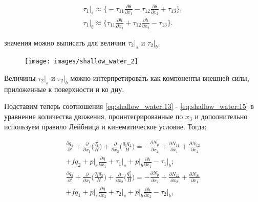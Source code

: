 \documentclass[14pt]{extreport}
\begin{document}
\begin{equation}\label{eq:shallow_water:16}
\begin{aligned}
 \tau_1\bigg|_s \approx \bigg\{ -\tau_{11}\frac{\partial \theta}{\partial x_1} -\tau_{12}\frac{\partial \theta}{\partial x_2} +\tau_{13}\bigg\}, \\
\tau_1\bigg|_b \approx \bigg\{ \tau_{11}\frac{\partial h}{\partial x_1} +\tau_{12}\frac{\partial h}{\partial x_2} -\tau_{13}\bigg\}.
\end{aligned}
\end{equation}

 значения можно выписать для величин $\tau_2|_s$ и $\tau_2|_b$.

\begin{figure}[H]
\centerline{
\texttt{[image: images/shallow\_water\_2]}}
\caption{}
\label{img:shallow_water:2}
\end{figure}


Величины $\tau_2|_s$ и $\tau_2|_b$ можно интерпретировать как компоненты внешней силы, приложенные к поверхности и ко дну.

Подставим теперь соотношения \ref{eq:shallow_water:13} - \ref{eq:shallow_water:15} в уравнение количества движения, проинтегрированные по $x_3$ и дополнительно используем правило Лейбница и кинематическое условие. Тогда:

\begin{equation}\label{eq:shallow_water:17}
\begin{aligned}
\frac{\partial q_1}{\partial t} + \frac{\partial}{\partial x_1} \bigg(\frac{q_1^2}{H}\bigg)+\frac{\partial }{\partial x_2}\bigg(\frac{q_1 q_2}{H}\bigg) = -\frac{\partial N_p}{\partial x_2} + \frac{\partial N_{11}}{\partial x_1} + \frac{\partial N_{12}}{\partial x_2} \\+ fq_2 + p\bigg|_s \frac{\partial \eta}{\partial x_1} + \tau_1\bigg|_s+p\bigg|_b\frac{\partial h}{\partial x_1} - \tau_1\bigg|_b; \\
\frac{\partial q_2}{\partial t} + \frac{\partial}{\partial x_1} \bigg(\frac{q_1 q_2}{H}\bigg)+\frac{\partial }{\partial x_2}\bigg(\frac{q_2^2}{H}\bigg) = -\frac{\partial N_p}{\partial x_2} + \frac{\partial N_{22}}{\partial x_2} + \frac{\partial N_{21}}{\partial x_1} \\+ fq_1 + p\bigg|_s \frac{\partial \eta}{\partial x_2} + \tau_2\bigg|_s+p\bigg|_b\frac{\partial h}{\partial x_2} - \tau_2\bigg|_b,
\end{aligned}
\end{equation}
\end{document}

